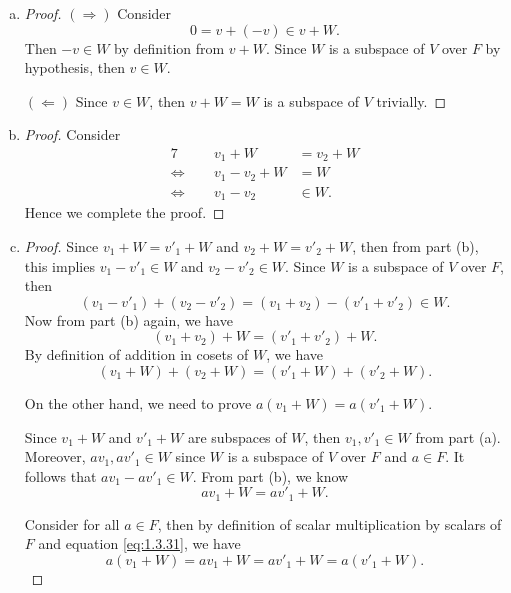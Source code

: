 \begin{Exercise}
	\begin{enumerate}[(a)]
		\item 
		\begin{proof}
			$(\Longrightarrow)$
			Consider
			$$
			0 = v + (-v) \in v+W.
			$$
			Then $-v\in W$ by definition from $v+W$. Since $W$ is a subspace of $V$ over $F$ by hypothesis, then $v\in W$.
			
			\vspace{2ex}
			
			$(\Longleftarrow)$
			Since $v\in W$, then $v+W = W$ is a subspace of $V$ trivially.
		\end{proof}
		
		\item 
		\begin{proof}
			Consider
			\begin{alignat*}{7}
				\quad&& v_1 + W &= v_2 + W \\
				\iff&& v_1-v_2 + W &= W \\
				\iff&& v_1-v_2 &\in W.
			\end{alignat*}
			Hence we complete the proof.
		\end{proof}
		
		\item
		\begin{proof}
			Since $v_1+W=v'_1+W$ and $v_2+W=v'_2+W$, then from part (b), this implies $v_1-v'_1\in W$ and $v_2-v'_2\in W$. Since $W$ is a subspace of $V$ over $F$, then
			$$
			(v_1-v'_1)+(v_2-v'_2)
			= (v_1+v_2)-(v'_1+v'_2)\in W.
			$$
			Now from part (b) again, we have
			$$
			(v_1+v_2)+W = (v'_1+v'_2)+W.
			$$
			By definition of addition in cosets of $W$, we have
			$$
			(v_1+W)+(v_2+W) = (v'_1+W)+(v'_2+W).
			$$
			
			On the other hand, we need to prove $a(v_1+W) = a(v'_1+W)$.
			
			Since $v_1+W$ and $v'_1+W$ are subspaces of $W$, then $v_1,v'_1\in W$ from part (a). Moreover, $a v_1, a v'_1\in W$ since $W$ is a subspace of $V$ over $F$ and $a\in F$. It follows that $a v_1-a v'_1\in W$. From part (b), we know
			\begin{equation}\label{eq:1.3.31}
				a v_1+W = a v'_1+W.
			\end{equation}
			
			Consider for all $a\in F$, then by definition of scalar multiplication by scalars of $F$ and equation \eqref{eq:1.3.31}, we have
			$$
			a(v_1+W)
			= a v_1 + W
			= a v'_1 + W
			= a(v'_1 + W).
			$$
			

\end{proof}
\end{enumerate}
\end{Exercise}
